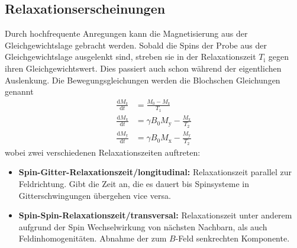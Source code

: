 \subsection{Relaxationserscheinungen}%
\label{sub:relaxationserscheinungen}
Durch hochfrequente Anregungen kann die Magnetisierung aus der
Gleichgewichtslage gebracht werden.
Sobald die Spins der Probe aus der Gleichgewichtslage ausgelenkt sind,
streben sie
in der Relaxationszeit
$T_\text{i}$ gegen ihren Gleichgewichtswert.
Dies passiert auch schon während der eigentlichen Auslenkung.
Die Bewegungsgleichungen werden die Blochschen Gleichungen genannt
\begin{align}
		\frac{\text{d} M_\text{z}}{\text{d} t} &= \frac{M_0 - M_\text{z}}{T_1} \\
		\frac{\text{d} M_\text{x}}{\text{d} t} &= \gamma B_0 M_\text{y} -
		\frac{M_\text{x}}{T_2} \\
		\frac{\text{d} M_\text{y}}{\text{d} t} &= \gamma B_0 M_\text{x} - \frac{M_\text{y}}{T_2}
\end{align}
wobei zwei verschiedenen Relaxationszeiten auftreten:
\begin{itemize}
		\item \textbf{Spin-Gitter-Relaxationszeit/longitudinal:}
				Relaxationszeit parallel zur Feldrichtung. Gibt die Zeit
				an, die es dauert bis Spinsysteme in Gitterschwingungen
				übergehen vice versa.
		\item \textbf{Spin-Spin-Relaxationszeit/transversal:} Relaxationszeit
				unter anderem aufgrund der Spin Wechselwirkung von nächsten
				Nachbarn, als auch Feldinhomogenitäten. Abnahme
				der zum $B$-Feld senkrechten Komponente.
\end{itemize}


